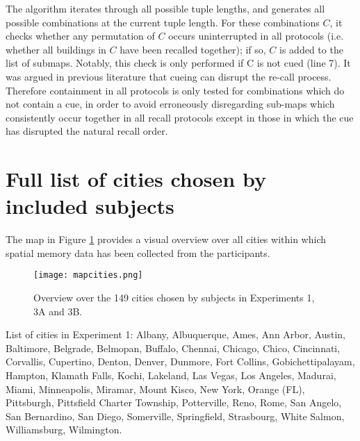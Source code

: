 The algorithm iterates through all possible tuple lengths, and generates all possible combinations at the current tuple length. For these combinations $C$, it checks whether any permutation of $C$ occurs uninterrupted in all protocols (i.e. whether all buildings in $C$ have been recalled together); if so, $C$ is added to the list of submaps. Notably, this check is only performed if C is not cued (line 7). It was argued in previous literature \citep{Hirtle_Jonides_1985, mcnamara1989subjective} that cueing can disrupt the re-call process. Therefore containment in all protocols is only tested for combinations which do not contain a cue, in order to avoid erroneously disregarding sub-maps which consistently occur together in all recall protocols except in those in which the cue has disrupted the natural recall order.

\section{Full list of cities chosen by included subjects}

The map in Figure \ref{fig_map} provides a visual overview over all cities within which spatial memory data has been collected from the participants.

\begin{figure}[h]
	\centering
	\texttt{[image: mapcities.png]}
	\caption{Overview over the 149 cities chosen by subjects in Experiments 1, 3A and 3B.}
	\label{fig_map}
\end{figure}

List of cities in Experiment 1: \footnotesize{Albany, Albuquerque, Ames, Ann Arbor, Austin, Baltimore, Belgrade, Belmopan, Buffalo, Chennai, Chicago, Chico, Cincinnati, Corvallis, Cupertino, Denton, Denver, Dunmore, Fort Collins, Gobichettipalayam, Hampton, Klamath Falls, Kochi, Lakeland, Las Vegas, Los Angeles, Madurai, Miami, Minneapolis, Miramar, Mount Kisco, New York, Orange (FL), Pittsburgh, Pittsfield Charter Township, Potterville, Reno, Rome, San Angelo, San Bernardino, San Diego, Somerville, Springfield, Strasbourg, White Salmon, Williamsburg, Wilmington}.

\normalsize

